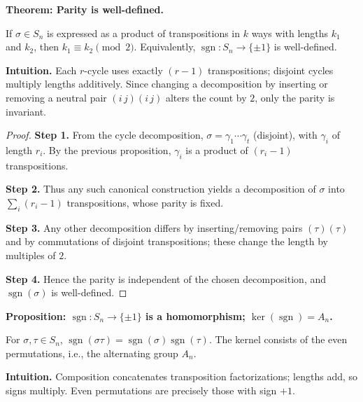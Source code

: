 \documentclass[9pt]{article}
\theoremstyle{definition}
\begin{document}
\newpage


\noindent\textbf{Theorem: Parity is well-defined.}

\newpage

If $\sigma\in S_n$ is expressed as a product of transpositions in $k$ ways with lengths $k_1$ and $k_2$, then $k_1\equiv k_2\pmod{2}$. Equivalently, $\operatorname{sgn}:S_n\to\{\pm1\}$ is well-defined.

\dotfill

\noindent\textbf{Intuition.}
Each $r$-cycle uses exactly $(r-1)$ transpositions; disjoint cycles multiply lengths additively. Since changing a decomposition by inserting or removing a neutral pair $(i\,j)(i\,j)$ alters the count by $2$, only the parity is invariant.

\dotfill

\begin{proof}
\textbf{Step 1.} From the cycle decomposition, $\sigma=\gamma_1\cdots\gamma_t$ (disjoint), with $\gamma_i$ of length $r_i$. By the previous proposition, $\gamma_i$ is a product of $(r_i-1)$ transpositions.

\textbf{Step 2.} Thus any such canonical construction yields a decomposition of $\sigma$ into $\sum_i(r_i-1)$ transpositions, whose parity is fixed.

\textbf{Step 3.} Any other decomposition differs by inserting/removing pairs $(\tau)(\tau)$ and by commutations of disjoint transpositions; these change the length by multiples of $2$.

\textbf{Step 4.} Hence the parity is independent of the chosen decomposition, and $\operatorname{sgn}(\sigma)$ is well-defined.
\end{proof}

\newpage


\noindent\textbf{Proposition: $\operatorname{sgn}:S_n\to\{\pm1\}$ is a homomorphism; $\ker(\operatorname{sgn})=A_n$.}

\newpage

For $\sigma,\tau\in S_n$, $\operatorname{sgn}(\sigma\tau)=\operatorname{sgn}(\sigma)\operatorname{sgn}(\tau)$. The kernel consists of the even permutations, i.e., the alternating group $A_n$.

\dotfill

\noindent\textbf{Intuition.}
Composition concatenates transposition factorizations; lengths add, so signs multiply. Even permutations are precisely those with sign $+1$.
\end{document}

